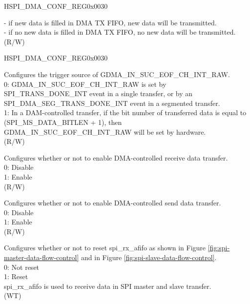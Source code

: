 \begin{register}{H}{SPI\_DMA\_CONF\_REG}{0x0030}
\begin{regdesc}
\begin{reglist}
        - if new data is filled in DMA TX FIFO, new data will be transmitted. \\
        - if no new data is filled in DMA TX FIFO, no new data will be transmitted. \\
 (R/W)
\item [Continued on the next page...]
\end{reglist}\end{regdesc}
\end{register}

\addtocounter{Regfloat}{-1}
\begin{register}{H}{SPI\_DMA\_CONF\_REG}{0x0030}
\begin{regdesc}\begin{reglist}
\item [Continued from the previous page...]
\label{fielddesc:SPIRXEOFEN}\item [SPI\_RX\_EOF\_EN] Configures the trigger source of GDMA\_IN\_SUC\_EOF\_CH\_INT\_RAW.\\
0: GDMA\_IN\_SUC\_EOF\_CH\_INT\_RAW is set by SPI\_TRANS\_DONE\_INT event in a single transfer, or by an SPI\_DMA\_SEG\_TRANS\_DONE\_INT event in a segmented transfer. \\
1: In a DAM-controlled transfer, if the bit number of transferred data is equal to (SPI\_MS\_DATA\_BITLEN + 1), then GDMA\_IN\_SUC\_EOF\_CH\_INT\_RAW will be set by hardware.\\
(R/W)
\label{fielddesc:SPIDMARXENA}\item [SPI\_DMA\_RX\_ENA] Configures whether or not to enable DMA-controlled receive data transfer.\\
0: Disable\\
1: Enable\\ (R/W)
\label{fielddesc:SPIDMATXENA}\item [SPI\_DMA\_TX\_ENA] Configures whether or not to enable DMA-controlled send data transfer.\\
0: Disable\\
1: Enable\\ (R/W)
\label{fielddesc:SPIRXAFIFORST}\item [SPI\_RX\_AFIFO\_RST] Configures whether or not to reset spi\_rx\_afifo as shown in Figure \ref{fig:spi-master-data-flow-control} and in Figure \ref{fig:spi-slave-data-flow-control}.\\
0: Not reset\\
1: Reset\\
spi\_rx\_afifo is used to receive data in SPI master and slave transfer. \\ (WT)

\end{reglist}
\end{regdesc}
\end{register}
